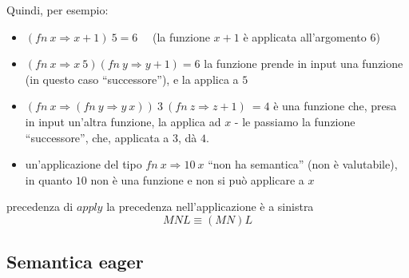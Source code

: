 \documentclass[a4paper,11pt]{report}
\begin{document}
Quindi, per esempio:
\begin{itemize}
    \item \( (fn \ x \Rightarrow x+1) \ 5 = 6\) \ \ (la funzione \( x+1 \) è applicata all'argomento \( 6 \))
    \item \( (fn \ x \Rightarrow x \ 5)(fn \ y \Rightarrow y + 1) = 6 \)
        \subitem la funzione prende in input una funzione (in questo caso ``successore''), e la applica a \( 5 \)
    \item \( (fn \ x \Rightarrow (fn \ y \Rightarrow y \ x)) \ 3 \ (fn \ z \Rightarrow z+1) \ = 4\)
        \subitem è una funzione che, presa in input un'altra funzione, la applica ad \( x \) - le passiamo la funzione ``successore'', che, applicata a \( 3 \), dà \( 4 \).
    \item un'applicazione del tipo \( fn \ x \Rightarrow 10 \ x \) ``non ha semantica'' (non è valutabile), in quanto \( 10 \) non è una funzione e non si può applicare a \( x \)
\end{itemize}

\begin{gframe}{precedenza di \( apply \)}
    la precedenza nell'applicazione è a sinistra
    \[ MNL \equiv (MN)L \]
\end{gframe}

\subsection{Semantica eager}
\end{document}
